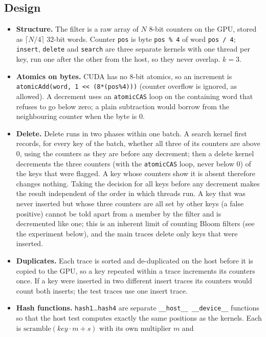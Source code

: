 \documentclass[11pt]{article}
\begin{document}
\subsection*{Design}
\begin{itemize}
\item \textbf{Structure.} The filter is a raw array of $N$ 8-bit counters on the
 GPU, stored as $\lceil N/4\rceil$ 32-bit words. Counter \texttt{pos} is byte
 \texttt{pos \% 4} of word \texttt{pos / 4}; \texttt{insert}, \texttt{delete}
 and \texttt{search} are three separate kernels with one thread per key, run
 one after the other from the host, so they never overlap. $k=3$.
\item \textbf{Atomics on bytes.} CUDA has no 8-bit atomics, so an increment is
 \texttt{atomicAdd(word, 1 << (8*(pos\%4)))} (counter overflow is ignored, as
 allowed). A decrement uses an \texttt{atomicCAS} loop on the containing word
 that refuses to go below zero; a plain subtraction would borrow from the
 neighbouring counter when the byte is 0.
\item \textbf{Delete.} Delete runs in two phases within one batch. A search
 kernel first records, for every key of the batch, whether all three of its
 counters are above 0, using the counters as they are before any decrement;
 then a delete kernel decrements the three counters (with the \texttt{atomicCAS}
 loop, never below 0) of the keys that were flagged. A key whose counters show
 it is absent therefore changes nothing. Taking the decision for all keys
 before any decrement makes the result independent of the order in which
 threads run. A key that was never inserted but whose three counters are all
 set by other keys (a false positive) cannot be told apart from a member by
 the filter and is decremented like one; this is an inherent limit of counting
 Bloom filters (see the experiment below), and the main traces delete only
 keys that were inserted.
\item \textbf{Duplicates.} Each trace is sorted and de-duplicated on the host
 before it is copied to the GPU, so a key repeated within a trace increments
 its counters once. If a key were inserted in two different insert traces its
 counters would count both inserts; the test traces use one insert trace.
\item \textbf{Hash functions.} \texttt{hash1}\dots\texttt{hash4} are separate
 \texttt{\_\_host\_\_ \_\_device\_\_} functions so that the host test computes
 exactly the same positions as the kernels. Each is
 $\mathrm{scramble}(\mathit{key}\cdot m+s)$ with its own multiplier $m$ and

\end{itemize}
\end{document}
